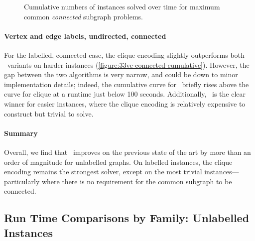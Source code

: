 \begin{figure}[h!]
    \centering
    \par\bigskip
    \caption{Cumulative numbers of instances solved over time for maximum
    common \emph{connected} subgraph problems.}\label{figure:mcs-cumulative-connected}
\end{figure}






\paragraph{Vertex and edge labels, undirected, connected} For the labelled,
connected case, the clique encoding slightly outperforms both \McSplit\
variants on harder instances (\cref{figure:33ve-connected-cumulative}).
However, the gap between the two algorithms is very narrow, and could be
down to minor implementation details; indeed, the cumulative curve for
\McSplit\ briefly rises above the curve for clique at a runtime just below 100
seconds. Additionally, \McSplit\ is the clear winner for easier instances,
where the clique encoding is relatively expensive to construct but trivial to
solve.






\paragraph{Summary} Overall, we find that \McSplit\ improves on the
previous state of the art by more than an order of magnitude for
unlabelled graphs.  On labelled instances, the clique encoding remains the
strongest solver, except on the most trivial instances---particularly where
there is no requirement for the common subgraph to be connected.





\FloatBarrier


\subsection{Run Time Comparisons by Family: Unlabelled Instances}


